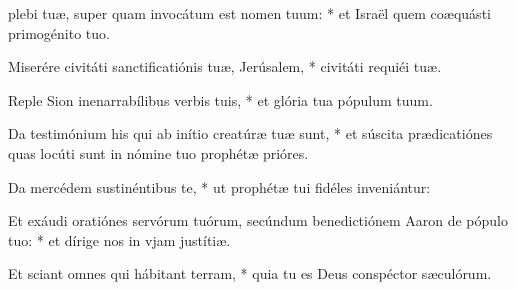 \begin{psalmus}

 plebi tuæ, super quam invocátum est nomen tuum: * et Israël quem coæquásti primogénito tuo.

Miserére civitáti sanctificatiónis tuæ, Jerúsalem, * civitáti requiéi tuæ.

Reple Sion inenarrabílibus verbis tuis, * et glória tua pópulum tuum.

Da testimónium his qui ab inítio creatúræ tuæ sunt, * et súscita prædicatiónes quas locúti sunt in nómine tuo prophétæ prióres.

Da mercédem sustinéntibus te, * ut prophétæ tui fidéles inveniántur:

Et exáudi oratiónes servórum tuórum, secúndum benedictiónem Aaron de pópulo tuo: * et dírige nos in vjam justítiæ.

Et sciant omnes qui hábitant terram, * quia tu es Deus conspéctor sæculórum.

\end{psalmus}
